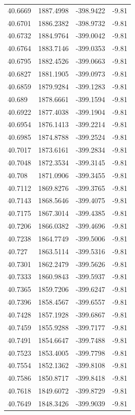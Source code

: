 \begin{table}[H]
\begin{tabular}{llll}
40.6669 & 1887.4998 & -398.9422 & -9.81 \\
40.6701 & 1886.2382 & -398.9732 & -9.81 \\
40.6732 & 1884.9764 & -399.0042 & -9.81 \\
40.6764 & 1883.7146 & -399.0353 & -9.81 \\
40.6795 & 1882.4526 & -399.0663 & -9.81 \\
40.6827 & 1881.1905 & -399.0973 & -9.81 \\
40.6859 & 1879.9284 & -399.1283 & -9.81 \\
40.689 & 1878.6661 & -399.1594 & -9.81 \\
40.6922 & 1877.4038 & -399.1904 & -9.81 \\
40.6954 & 1876.1413 & -399.2214 & -9.81 \\
40.6985 & 1874.8788 & -399.2524 & -9.81 \\
40.7017 & 1873.6161 & -399.2834 & -9.81 \\
40.7048 & 1872.3534 & -399.3145 & -9.81 \\
40.708 & 1871.0906 & -399.3455 & -9.81 \\
40.7112 & 1869.8276 & -399.3765 & -9.81 \\
40.7143 & 1868.5646 & -399.4075 & -9.81 \\
40.7175 & 1867.3014 & -399.4385 & -9.81 \\
40.7206 & 1866.0382 & -399.4696 & -9.81 \\
40.7238 & 1864.7749 & -399.5006 & -9.81 \\
40.727 & 1863.5114 & -399.5316 & -9.81 \\
40.7301 & 1862.2479 & -399.5626 & -9.81 \\
40.7333 & 1860.9843 & -399.5937 & -9.81 \\
40.7365 & 1859.7206 & -399.6247 & -9.81 \\
40.7396 & 1858.4567 & -399.6557 & -9.81 \\
40.7428 & 1857.1928 & -399.6867 & -9.81 \\
40.7459 & 1855.9288 & -399.7177 & -9.81 \\
40.7491 & 1854.6647 & -399.7488 & -9.81 \\
40.7523 & 1853.4005 & -399.7798 & -9.81 \\
40.7554 & 1852.1362 & -399.8108 & -9.81 \\
40.7586 & 1850.8717 & -399.8418 & -9.81 \\
40.7618 & 1849.6072 & -399.8729 & -9.81 \\
40.7649 & 1848.3426 & -399.9039 & -9.81 \\

\end{tabular}
\end{table}
